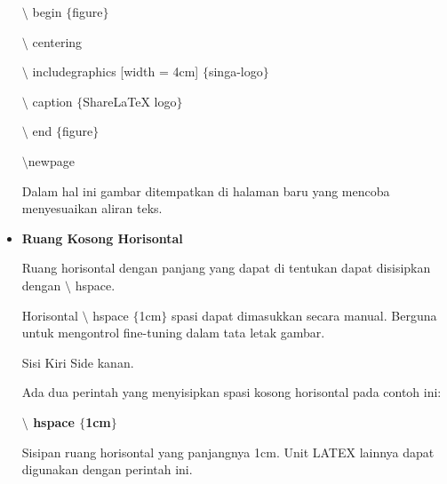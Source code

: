 \begin{itemize}
\hspace*{0.5in}$\setminus$ begin $ \{ $figure$ \} $\par

\hspace*{0.5in}$\setminus$ centering\par

\hspace*{0.5in}$\setminus$ includegraphics [width = 4cm] $ \{ $singa-logo$ \} $\par

\hspace*{0.5in}$\setminus$ caption $ \{ $ShareLaTeX logo$ \} $\par

\hspace*{0.5in}$\setminus$ end $ \{ $figure$ \} $ \par

\hspace*{0.5in}$\setminus$newpage\par

Dalam hal ini gambar ditempatkan di halaman baru yang mencoba menyesuaikan aliran teks.\par

\vspace{10pt}
	\item {\fontsize{14pt}{14pt}\selectfont \textbf{Ruang Kosong Horisontal}}\par

Ruang horisontal dengan panjang yang dapat di tentukan dapat disisipkan dengan $\setminus$ hspace.\par

Horisontal $\setminus$ hspace $ \{ $1cm$ \} $ spasi dapat dimasukkan secara manual. Berguna untuk mengontrol fine-tuning dalam tata letak gambar.\par

Sisi Kiri Side kanan.\par

Ada dua perintah yang menyisipkan spasi kosong horisontal pada contoh ini:\par

\hspace*{0.5in}\textbf{$\setminus$ hspace $ \{ $1cm$ \} $}\par

\hspace*{0.5in}Sisipan ruang horisontal yang panjangnya 1cm. Unit LATEX lainnya dapat digunakan \hspace*{0.5in}dengan perintah ini.\par


\end{itemize}
